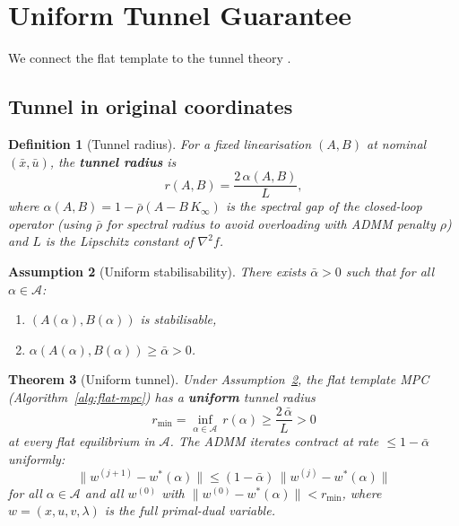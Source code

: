 \documentclass[11pt]{article}
\newtheorem{theorem}{Theorem}[section]
\newtheorem{definition}[theorem]{Definition}
\newtheorem{assumption}[theorem]{Assumption}
\newcommand{\norm}[1]{\|#1\|}
\begin{document}
\section{Uniform Tunnel Guarantee}\label{sec:tunnel}

We connect the flat template to the tunnel theory
\cite{zhang2026ttt}.

\subsection{Tunnel in original coordinates}

\begin{definition}[Tunnel radius]\label{def:tunnel}
For a fixed linearisation $(A, B)$ at nominal
$(\bar x, \bar u)$, the \textbf{tunnel radius} is
\begin{equation}\label{eq:tunnel-radius}
  r(A, B) = \frac{2\,\alpha(A, B)}{L},
\end{equation}
where $\alpha(A, B) = 1 - \bar\rho(A - B\,K_\infty)$
is the spectral gap of the closed-loop operator
(using $\bar\rho$ for spectral radius to avoid
overloading with ADMM penalty $\rho$)
and $L$ is the Lipschitz constant of $\nabla^2 f$.
\end{definition}

\begin{assumption}[Uniform stabilisability]
\label{ass:uniform}
There exists $\bar\alpha > 0$ such that
for all $\alpha \in \mathcal{A}$:
\begin{enumerate}[label=(\roman*), leftmargin=8mm]
  \item $(A(\alpha), B(\alpha))$ is stabilisable,
  \item $\alpha(A(\alpha), B(\alpha)) \ge \bar\alpha > 0$.
\end{enumerate}
\end{assumption}

\begin{theorem}[Uniform tunnel]\label{thm:uniform}
Under Assumption~\ref{ass:uniform},
the flat template MPC
(Algorithm~\ref{alg:flat-mpc})
has a \textbf{uniform} tunnel radius
\begin{equation}\label{eq:uniform-tunnel}
  r_{\min} = \inf_{\alpha \in \mathcal{A}}\,
  r(\alpha) \ge \frac{2\,\bar\alpha}{L} > 0
\end{equation}
at every flat equilibrium in $\mathcal{A}$.
The ADMM iterates contract at rate
$\le 1 - \bar\alpha$ uniformly:
\begin{equation}\label{eq:uniform-contract}
  \norm{w^{(j+1)} - w^*(\alpha)}
  \le (1 - \bar\alpha)\,
  \norm{w^{(j)} - w^*(\alpha)}
\end{equation}
for all $\alpha \in \mathcal{A}$
and all $w^{(0)}$ with
$\norm{w^{(0)} - w^*(\alpha)} < r_{\min}$,
where $w = (x, u, v, \lambda)$ is the full
primal-dual variable.
\end{theorem}
\end{document}
